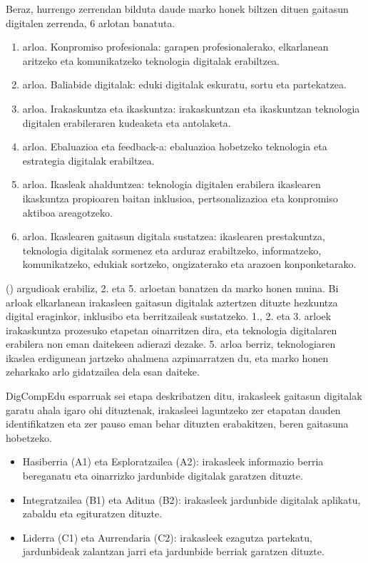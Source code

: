 Beraz, hurrengo zerrendan bilduta daude marko honek biltzen dituen gaitasun digitalen zerrenda, 6 arlotan banatuta.

\begin{enumerate}
    \item arloa. Konpromiso profesionala: garapen profesionalerako, elkarlanean aritzeko eta komunikatzeko teknologia digitalak erabiltzea.
    \item arloa. Baliabide digitalak: eduki digitalak eskuratu, sortu eta partekatzea.
    \item arloa. Irakaskuntza eta ikaskuntza: irakaskuntzan eta ikaskuntzan teknologia digitalen erabileraren kudeaketa eta antolaketa.
    \item arloa. Ebaluazioa eta feedback-a: ebaluazioa hobetzeko teknologia eta estrategia digitalak erabiltzea.
    \item arloa. Ikasleak ahalduntzea: teknologia digitalen erabilera ikaslearen ikaskuntza propioaren baitan inklusioa, pertsonalizazioa eta konpromiso aktiboa areagotzeko.
    \item arloa. Ikaslearen gaitasun digitala sustatzea: ikaslearen prestakuntza, teknologia digitalak sormenez eta arduraz erabiltzeko, informatzeko, komunikatzeko, edukiak sortzeko, ongizaterako eta arazoen konponketarako.
\end{enumerate}

\citeauthor{JRC107466} (\citeyear{JRC107466}) argudioak erabiliz, 2. eta 5. arloetan banatzen da marko honen muina. Bi arloak elkarlanean irakasleen gaitasun digitalak aztertzen dituzte hezkuntza digital eraginkor, inklusibo eta berritzaileak sustatzeko. 1., 2. eta 3. arloek irakaskuntza prozesuko etapetan oinarritzen dira, eta teknologia digitalaren erabilera non eman daitekeen adierazi dezake. 5. arloa berriz, teknologiaren ikaslea erdigunean jartzeko ahalmena azpimarratzen du, eta marko honen zeharkako arlo gidatzailea dela esan daiteke.

DigCompEdu esparruak sei etapa deskribatzen ditu, irakasleek gaitasun digitalak garatu ahala igaro ohi dituztenak, irakasleei laguntzeko zer etapatan dauden identifikatzen eta zer pauso eman behar dituzten erabakitzen, beren gaitasuna hobetzeko.

\begin{itemize}
    \item Hasiberria (A1) eta Esploratzailea (A2): irakasleek informazio berria bereganatu eta oinarrizko jardunbide digitalak garatzen dituzte.
    \item Integratzailea (B1) eta Aditua (B2): irakasleek jardunbide digitalak aplikatu, zabaldu eta egituratzen dituzte.
    \item Liderra (C1) eta Aurrendaria (C2): irakasleek ezagutza partekatu, jardunbideak zalantzan jarri eta jardunbide berriak garatzen dituzte.
\end{itemize}

